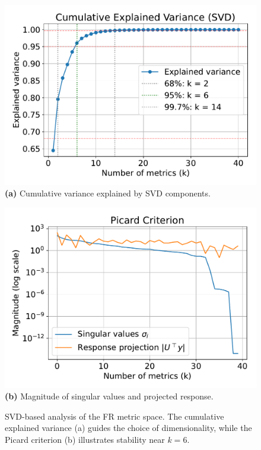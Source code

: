 \begin{figure}[ht]
    \centering
    \begin{minipage}[t]{0.48\textwidth}
        \centering
        \includegraphics[width=\linewidth]{images/variance.pdf}
        \textbf{(a)} Cumulative variance explained by SVD components.
    \end{minipage}
    \hfill
    \begin{minipage}[t]{0.48\textwidth}
        \centering
        \includegraphics[width=\linewidth]{images/picard.pdf}
        \textbf{(b)} Magnitude of singular values and projected response.
    \end{minipage}
    \caption{SVD-based analysis of the FR metric space. The cumulative explained variance (a) guides the choice of dimensionality, while the Picard criterion (b) illustrates stability near $k=6$.}\label{fig:svd_analysis}
\end{figure}

